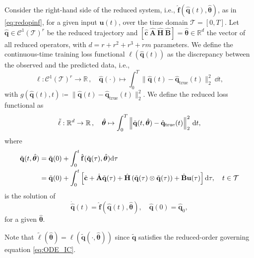\begin{definition} 
    \label{def:continuous_loss}
    Consider the right-hand side of the reduced system, i.e., $\hat{\mathbf{f}}(\hat{\mathbf{q}}(t),\hat{\bm{\theta}})$, as in \eqref{eq:redopinf}, for a given input $\mathbf{u}(t)$, over the time domain $\mathcal{T}=[0,T]$. Let $\hat{\mathbf{q}}\in\mathcal{C}^1(\mathcal{T})^r$ be the reduced trajectory and $[\hat{\mathbf{c}}~\hat{\mathbf{A}}~\hat{\mathbf{H}}~\hat{\mathbf{B}}]=\hat{\bm{\theta}}\in\mathbb{R}^d$ the vector of all reduced operators, with $d=r+r^2+r^3+rm$ parameters. We define the continuous-time training loss functional $\ell(\hat{\mathbf{q}}(t))$ as the discrepancy between the observed and the predicted data, i.e.,\\
    \begin{equation}
        \ell: \mathcal{C}^1(\mathcal{T})^r  \to \mathbb{R}\,,\quad \hat{\mathbf{q}}(\cdot) \mapsto \int_0^T \Big\|\hat{\mathbf{q}}(t) - \hat{\mathbf{q}}_\mathrm{true}(t)\Big\|_2^2~\dd t,
        \label{eq:continuous_loss}
    \end{equation}
    with $g(\hat{\mathbf{q}}(t),t) \coloneqq \Big\|\hat{\mathbf{q}}(t) - \hat{\mathbf{q}}_\mathrm{true}(t)\Big\|_2^2$. We define the reduced loss functional as\\ 
    \begin{equation}
        \tilde{\ell}: \mathbb{R}^d  \to \mathbb{R}\,,\quad \hat{\bm{\theta}} \mapsto \int_0^T \norm{\tilde{\mathbf{q}}(t,\hat{\bm{\theta}}) - \hat{\mathbf{q}}_\mathrm{true}(t)}_2^2~\dd t,
        \label{eq:continuous_reduced_loss}
    \end{equation}
    where\\
    \begin{align}
        \tilde{\mathbf{q}}(t, \hat{\bm{\theta}}) &= \tilde{\mathbf{q}}(0) + \displaystyle\int_{0}^t \hat{\mathbf{f}}(\tilde{\mathbf{q}}(\tau),\hat{\bm{\theta}})\dd \tau \notag \\
        &= \tilde{\mathbf{q}}(0) + \displaystyle\int_{0}^t\left[ \hat{\mathbf{c}} + \hat{\mathbf{A}}\tilde{\mathbf{q}}(\tau) + \hat{\mathbf{H}}\left(\tilde{\mathbf{q}}(\tau)\otimes\tilde{\mathbf{q}}(\tau) \right) +\hat{\mathbf{B}}\mathbf{u}(\tau) \right]\dd \tau, \quad t\in\mathcal{T}
    \end{align}  is the solution of\\
    \begin{equation}
        \dot{\hat{\mathbf{q}}}(t) = \hat{\mathbf{f}}(\hat{\mathbf{q}}(t),\hat{\bm{\theta}}), \quad\hat{\mathbf{q}}(0)=\hat{\mathbf{q}}_0,
        \label{eq:ODE_IC}
    \end{equation}
    for a given $\hat{\bm{\theta}}$.
\end{definition}
Note that $\tilde{\ell}(\hat{\bm{\theta}}) = \ell(\tilde{\mathbf{q}}(\cdot,\hat{\bm{\theta}}))$ since $\tilde{\mathbf{q}}$ satisfies the reduced-order governing equation \eqref{eq:ODE_IC}.

